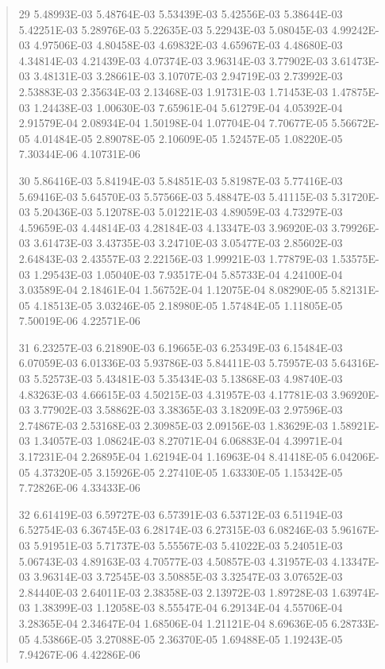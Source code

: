 \documentclass[letterpaper,10pt,english]{sphinxmanual}
\begin{document}
\begin{quote}
\begin{DUlineblock}{0em}
\item[] 29   5.48993E-03  5.48764E-03  5.53439E-03  5.42556E-03  5.38644E-03  5.42251E-03  5.28976E-03  5.22635E-03  5.22943E-03  5.08045E-03  4.99242E-03  4.97506E-03  4.80458E-03  4.69832E-03  4.65967E-03  4.48680E-03  4.34814E-03  4.21439E-03  4.07374E-03  3.96314E-03  3.77902E-03  3.61473E-03  3.48131E-03  3.28661E-03  3.10707E-03  2.94719E-03  2.73992E-03  2.53883E-03  2.35634E-03  2.13468E-03  1.91731E-03  1.71453E-03  1.47875E-03  1.24438E-03  1.00630E-03  7.65961E-04  5.61279E-04  4.05392E-04  2.91579E-04  2.08934E-04  1.50198E-04  1.07704E-04  7.70677E-05  5.56672E-05  4.01484E-05  2.89078E-05  2.10609E-05  1.52457E-05  1.08220E-05  7.30344E-06  4.10731E-06
\item[] 30   5.86416E-03  5.84194E-03  5.84851E-03  5.81987E-03  5.77416E-03  5.69416E-03  5.64570E-03  5.57566E-03  5.48847E-03  5.41115E-03  5.31720E-03  5.20436E-03  5.12078E-03  5.01221E-03  4.89059E-03  4.73297E-03  4.59659E-03  4.44814E-03  4.28184E-03  4.13347E-03  3.96920E-03  3.79926E-03  3.61473E-03  3.43735E-03  3.24710E-03  3.05477E-03  2.85602E-03  2.64843E-03  2.43557E-03  2.22156E-03  1.99921E-03  1.77879E-03  1.53575E-03  1.29543E-03  1.05040E-03  7.93517E-04  5.85733E-04  4.24100E-04  3.03589E-04  2.18461E-04  1.56752E-04  1.12075E-04  8.08290E-05  5.82131E-05  4.18513E-05  3.03246E-05  2.18980E-05  1.57484E-05  1.11805E-05  7.50019E-06  4.22571E-06
\item[] 31   6.23257E-03  6.21890E-03  6.19665E-03  6.25349E-03  6.15484E-03  6.07059E-03  6.01336E-03  5.93786E-03  5.84411E-03  5.75957E-03  5.64316E-03  5.52573E-03  5.43481E-03  5.35434E-03  5.13868E-03  4.98740E-03  4.83263E-03  4.66615E-03  4.50215E-03  4.31957E-03  4.17781E-03  3.96920E-03  3.77902E-03  3.58862E-03  3.38365E-03  3.18209E-03  2.97596E-03  2.74867E-03  2.53168E-03  2.30985E-03  2.09156E-03  1.83629E-03  1.58921E-03  1.34057E-03  1.08624E-03  8.27071E-04  6.06883E-04  4.39971E-04  3.17231E-04  2.26895E-04  1.62194E-04  1.16963E-04  8.41418E-05  6.04206E-05  4.37320E-05  3.15926E-05  2.27410E-05  1.63330E-05  1.15342E-05  7.72826E-06  4.33433E-06
\item[] 32   6.61419E-03  6.59727E-03  6.57391E-03  6.53712E-03  6.51194E-03  6.52754E-03  6.36745E-03  6.28174E-03  6.27315E-03  6.08246E-03  5.96167E-03  5.91951E-03  5.71737E-03  5.55567E-03  5.41022E-03  5.24051E-03  5.06743E-03  4.89163E-03  4.70577E-03  4.50857E-03  4.31957E-03  4.13347E-03  3.96314E-03  3.72545E-03  3.50885E-03  3.32547E-03  3.07652E-03  2.84440E-03  2.64011E-03  2.38358E-03  2.13972E-03  1.89728E-03  1.63974E-03  1.38399E-03  1.12058E-03  8.55547E-04  6.29134E-04  4.55706E-04  3.28365E-04  2.34647E-04  1.68506E-04  1.21121E-04  8.69636E-05  6.28733E-05  4.53866E-05  3.27088E-05  2.36370E-05  1.69488E-05  1.19243E-05  7.94267E-06  4.42286E-06

\end{DUlineblock}
\end{quote}
\end{document}
